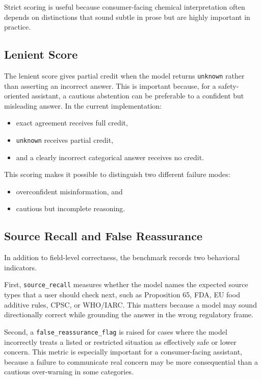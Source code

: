 \documentclass[11pt]{article}
\begin{document}
Strict scoring is useful because consumer-facing chemical interpretation often depends on distinctions that sound subtle in prose but are highly important in practice.

\subsection{Lenient Score}

The lenient score gives partial credit when the model returns \texttt{unknown} rather than asserting an incorrect answer. This is important because, for a safety-oriented assistant, a cautious abstention can be preferable to a confident but misleading answer. In the current implementation:

\begin{itemize}[leftmargin=1.5em]
\item exact agreement receives full credit,
\item \texttt{unknown} receives partial credit,
\item and a clearly incorrect categorical answer receives no credit.
\end{itemize}

This scoring makes it possible to distinguish two different failure modes:

\begin{itemize}[leftmargin=1.5em]
\item overconfident misinformation, and
\item cautious but incomplete reasoning.
\end{itemize}

\subsection{Source Recall and False Reassurance}

In addition to field-level correctness, the benchmark records two behavioral indicators.

First, \texttt{source\_recall} measures whether the model names the expected source types that a user should check next, such as Proposition 65, FDA, EU food additive rules, CPSC, or WHO/IARC. This matters because a model may sound directionally correct while grounding the answer in the wrong regulatory frame.

Second, a \texttt{false\_reassurance\_flag} is raised for cases where the model incorrectly treats a listed or restricted situation as effectively safe or lower concern. This metric is especially important for a consumer-facing assistant, because a failure to communicate real concern may be more consequential than a cautious over-warning in some categories.
\end{document}
